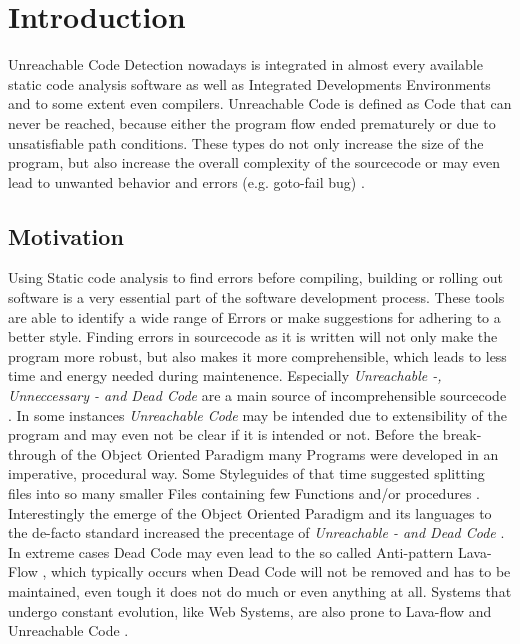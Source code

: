 
\chapter{Introduction}
\label{cha:introduction}

Unreachable Code Detection nowadays is integrated in almost every available static code analysis software as well as Integrated Developments Environments and to some extent even compilers.
Unreachable Code is defined as Code that can never be reached, because either the program flow ended prematurely or due to unsatisfiable path conditions.
These types do not only increase the size of the program, but also increase the overall complexity of the sourcecode or may even lead to unwanted behavior and errors (e.g. goto-fail bug) \cite{Boyes_2014}.

\section{Motivation}
Using Static code analysis to find errors before compiling, building or rolling out software is a very essential part of the software development process.
These tools are able to identify a wide range of Errors or make suggestions for adhering to a better style.
Finding errors in sourcecode as it is written will not only make the program more robust, but also makes it more comprehensible, which leads to less time and energy needed during maintenence.
Especially \emph{Unreachable -, Unneccessary - and Dead Code} are a main source of incomprehensible sourcecode \cite{Romano_2020}.
In some instances \emph{Unreachable Code} may be intended due to extensibility of the program \cite{Haas_2020} and may even not be clear if it is intended or not.
Before the break-through of the Object Oriented Paradigm many Programs were developed in an imperative, procedural way. Some Styleguides of that time suggested splitting files into so many smaller Files containing few Functions and/or procedures \cite{Srivastava_1992}.
Interestingly the emerge of the Object Oriented Paradigm and its languages to the de-facto standard increased the precentage of \emph{Unreachable - and Dead Code} \cite{Srivastava_1992}.
In extreme cases Dead Code may even lead to the so called Anti-pattern Lava-Flow \cite{Romano_2020}, which typically occurs when Dead Code will not be removed and has to be maintained, even tough it does not do much or even anything at all.
Systems that undergo constant evolution, like Web Systems, are also prone to Lava-flow and Unreachable Code \cite{Boomsma_2012}.


